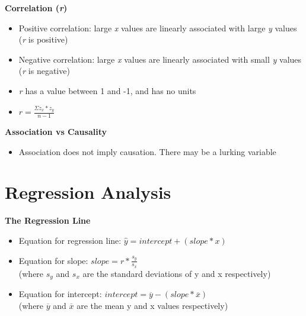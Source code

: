 \documentclass{article}
\begin{document}
\noindent
\textbf{Correlation (\emph{r})}
\begin{itemize}
    \item Positive correlation: large \emph{x} values are linearly associated with large \emph{y} values (\emph{r} is positive)
    \item Negative correlation: large \emph{x} values are linearly associated with small \emph{y} values (\emph{r} is negative)
    \item \emph{r} has a value between 1 and -1, and has no units
    \item \begin{math}
    r = \frac{\Sigma z_x * z_y}{n - 1}
    \end{math}
\end{itemize}

\noindent
\textbf{Association vs Causality}
\begin{itemize}
    \item Association does not imply causation. There may be a lurking variable
\end{itemize}

\section{Regression Analysis}

\textbf{The Regression Line}
\begin{itemize}
    \item Equation for regression line: \begin{math}\hat y = intercept + (slope * x)\end{math}
    \item Equation for slope: \begin{math}
    slope = r * \frac{s_y}{s_x}
    \end{math}\\
    (where \begin{math}s_y\end{math} and \begin{math}s_x\end{math} are the standard deviations of y and x respectively)
    \item Equation for intercept: \begin{math}
    intercept = \overline{y} - (slope * \overline{x})
    \end{math} \\
    (where \begin{math}\overline{y}\end{math} and \begin{math}\overline{x}\end{math} are the mean y and x values respectively)
\end{itemize}
\end{document}

